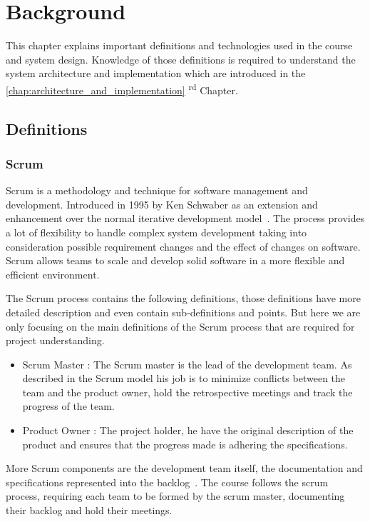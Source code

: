 \chapter{Background}
\label{chap:background}

This chapter explains important definitions and technologies used in the course and system design. Knowledge of those definitions
is required to understand the system architecture and implementation which are introduced in the \ref{chap:architecture_and_implementation}
\textsuperscript{rd} Chapter.

\section{Definitions}
\label{sec:definitions}

\subsection{Scrum}
\label{sub:scrum-process}

Scrum is a methodology and technique for software management and development. Introduced in 1995 by Ken Schwaber
as an extension and enhancement over the normal iterative development model~\cite{Schwaber1997}. The process
provides a lot of flexibility to handle complex system development taking into consideration possible requirement
changes and the effect of changes on software. Scrum allows teams to scale and develop solid software in a more flexible and efficient
environment.~\cite{Schwaber1997}

\newParagraph
The Scrum process contains the following definitions, those definitions have more detailed description and even contain
sub-definitions and points. But here we are only focusing on the main definitions of the Scrum process that are required for project understanding.
\begin{itemize}
  \item Scrum Master : The Scrum master is the lead of the development team. As described in the Scrum model his job
  is to minimize conflicts between the team and the product owner, hold the retrospective meetings and track
  the progress of the team.~\cite{schwaber_2004}
  \item Product Owner : The project holder, he have the original description of the product and ensures that the
  progress made is adhering the specifications.~\cite{schwaber_2004}
\end{itemize}

\newParagraph
More Scrum components are the development team itself, the documentation and specifications represented into the backlog~\cite{schwaber_2004}.
The course follows the scrum process, requiring each team to be formed by the scrum master, documenting their backlog and hold their meetings.

